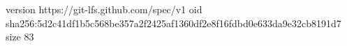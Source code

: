 version https://git-lfs.github.com/spec/v1
oid sha256:5d2c41df1b5c568be357a2f2425af1360df2e8f16fdbd0e633da9e32cb8191d7
size 83
